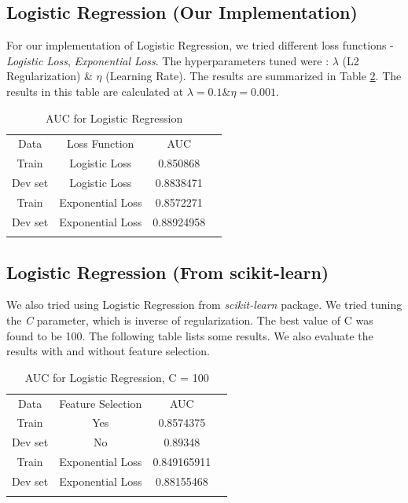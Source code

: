 \documentclass[conference]{IEEEtran}
\numberwithin{equation}{section}
\numberwithin{figure}{section}
\numberwithin{table}{section}
\begin{document}
\subsection{Logistic Regression (Our Implementation)}
For our implementation of Logistic Regression, we tried different loss functions - \textit{Logistic Loss}, \textit{Exponential Loss}. The hyperparameters tuned were : \textit{$\lambda$} (L2 Regularization) \& \textit{$\eta$} (Learning Rate). The results are summarized in Table \ref{tab_lr}. The results in this table are calculated at $\lambda = 0.1 \& \eta = 0.001$.

\begin{table}[!htb]
 \centering
 \caption{AUC for Logistic Regression}
 \label{tab_lr}
\begin{tabular}{ c c c c } 
	    \noalign{\smallskip}\hline\noalign{\smallskip}
		Data &  Loss Function & AUC \\
    	   \noalign{\smallskip}\hline\noalign{\smallskip}
		Train &  Logistic Loss & 0.850868\\
		Dev set & Logistic Loss & 0.8838471\\
		\noalign{\smallskip}\hline\noalign{\smallskip}
		Train &  Exponential Loss & 0.8572271\\
		Dev set & Exponential Loss & 0.88924958\\
		\noalign{\smallskip}\hline\noalign{\smallskip}	
  \end{tabular} 
\end{table}

\subsection{Logistic Regression (From scikit-learn)}
We also tried using Logistic Regression from \textit{scikit-learn} package. We tried tuning the \textit{C} parameter, which is inverse of 	regularization. The best value of C was found to be 100. The following table lists some results. We also evaluate the results with and without feature selection. 

\begin{table}[!htb]
 \centering
 \caption{AUC for Logistic Regression, C = 100}
 \label{tab_lr}
\begin{tabular}{ c c c c } 
	    \noalign{\smallskip}\hline\noalign{\smallskip}
		Data &  Feature Selection & AUC \\
    	   \noalign{\smallskip}\hline\noalign{\smallskip}
		Train &  Yes & 0.8574375\\
		Dev set & No & 0.89348\\
		\noalign{\smallskip}\hline\noalign{\smallskip}
		Train &  Exponential Loss & 0.849165911\\
		Dev set & Exponential Loss & 0.88155468\\
		\noalign{\smallskip}\hline\noalign{\smallskip}	
  \end{tabular} 
\end{table}
\end{document}

